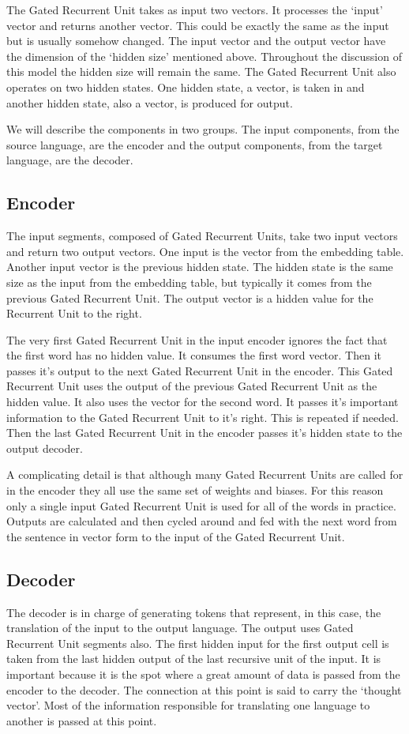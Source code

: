 The Gated Recurrent Unit takes as input two vectors. It processes the `input' vector and returns another vector. This could be exactly the same as the input but is usually somehow changed. The input vector and the output vector have the dimension of the `hidden size' mentioned above. Throughout the discussion of this model the hidden size will remain the same. The Gated Recurrent Unit also operates on two hidden states. One hidden state, a vector, is taken in and another hidden state, also a vector, is produced for output.

We will describe the components in two groups. The input components, from the source language, are the encoder and the output components, from the target language, are the decoder.



\subsection{Encoder}

The input segments, composed of Gated Recurrent Units, take two input vectors and return two output vectors. One input is the vector from the embedding table. Another input vector is the previous hidden state. The hidden state is the same size as the input from the embedding table, but typically it comes from the previous Gated Recurrent Unit. The output vector is a hidden value for the Recurrent Unit to the right.

The very first Gated Recurrent Unit in the input encoder ignores the fact that the first word has no hidden value. It consumes the first word vector. Then it passes it's output to the next Gated Recurrent Unit in the encoder. This Gated Recurrent Unit uses the output of the previous Gated Recurrent Unit as the hidden value. It also uses the vector for the second word. It passes it's important information to the Gated Recurrent Unit to it's right. This is repeated if needed. Then the last Gated Recurrent Unit in the encoder passes it's hidden state to the output decoder.

A complicating detail is that although many Gated Recurrent Units are called for in the encoder they all use the same set of weights and biases. For this reason only a single input Gated Recurrent Unit is used for all of the words in practice. Outputs are calculated and then cycled around and fed with the next word from the sentence in vector form to the input of the Gated Recurrent Unit. 

\subsection{Decoder}
The decoder is in charge of generating tokens that represent, in this case, the translation of the input to the output language. The output uses Gated Recurrent Unit segments also. The first hidden input for the first output cell is taken from the last hidden output of the last recursive unit of the input. It is important because it is the spot where a great amount of data is passed from the encoder to the decoder. The connection at this point is said to carry the `thought vector'. Most of the information responsible for translating one language to another is passed at this point.

